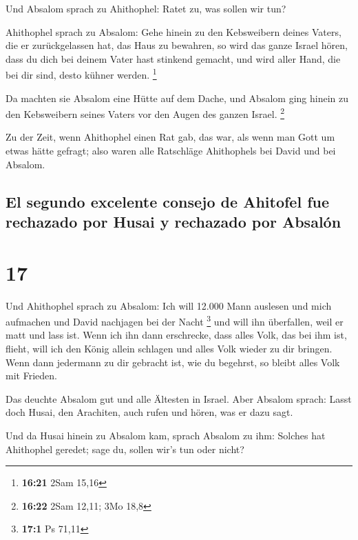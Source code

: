  Und Absalom sprach zu Ahithophel: Ratet zu, was sollen
wir tun?

 Ahithophel sprach zu Absalom: Gehe hinein zu den
Kebsweibern deines Vaters, die er zurückgelassen hat, das Haus zu
bewahren, so wird das ganze Israel hören, dass du dich bei deinem Vater
hast stinkend gemacht, und wird aller Hand, die bei dir sind, desto
kühner werden. \footnote{\textbf{16:21} 2Sam 15,16}

 Da machten sie Absalom eine Hütte auf dem Dache, und
Absalom ging hinein zu den Kebsweibern seines Vaters vor den Augen des
ganzen Israel. \footnote{\textbf{16:22} 2Sam 12,11; 3Mo 18,8}

 Zu der Zeit, wenn Ahithophel einen Rat gab, das war, als
wenn man Gott um etwas hätte gefragt; also waren alle Ratschläge
Ahithophels bei David und bei Absalom.

\hypertarget{el-segundo-excelente-consejo-de-ahitofel-fue-rechazado-por-husai-y-rechazado-por-absaluxf3n}{%
\subsection{El segundo excelente consejo de Ahitofel fue rechazado por
Husai y rechazado por
Absalón}\label{el-segundo-excelente-consejo-de-ahitofel-fue-rechazado-por-husai-y-rechazado-por-absaluxf3n}}

\hypertarget{section-16}{%
\section{17}\label{section-16}}

 Und Ahithophel sprach zu Absalom: Ich will 12.000 Mann
auslesen und mich aufmachen und David nachjagen bei der Nacht
\footnote{\textbf{17:1} Ps 71,11}  und will ihn
überfallen, weil er matt und lass ist. Wenn ich ihn dann erschrecke,
dass alles Volk, das bei ihm ist, flieht, will ich den König allein
schlagen  und alles Volk wieder zu dir bringen. Wenn dann
jedermann zu dir gebracht ist, wie du begehrst, so bleibt alles Volk mit
Frieden.

 Das deuchte Absalom gut und alle Ältesten in Israel.
 Aber Absalom sprach: Lasst doch Husai, den Arachiten,
auch rufen und hören, was er dazu sagt.

 Und da Husai hinein zu Absalom kam, sprach Absalom zu
ihm: Solches hat Ahithophel geredet; sage du, sollen wir's tun oder
nicht?

